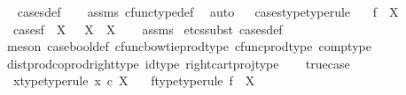 \begin{isabellebody}
%
\isadelimproof
\ \ %
\endisadelimproof
%
\isatagproof
{}\isamarkupfalse%
\ cases{\isacharunderscore}{\kern0pt}def\isanewline
\ \ \isamarkupfalse%
\ assms\ cfunc{\isacharunderscore}{\kern0pt}type{\isacharunderscore}{\kern0pt}def\ \isamarkupfalse%
\ auto%
\endisatagproof
{\isafoldproof}%
%
\isadelimproof
\ \isanewline
%
\endisadelimproof
\isanewline
{}\isamarkupfalse%
\ cases{\isacharunderscore}{\kern0pt}type{\isacharbrackleft}{\kern0pt}type{\isacharunderscore}{\kern0pt}rule{\isacharbrackright}{\kern0pt}{\isacharcolon}{\kern0pt}\isanewline
\ \ \ {\isachardoublequoteopen}f\ {\isacharcolon}{\kern0pt}\ X\ {\isasymrightarrow}\ {\isasymOmega}{\isachardoublequoteclose}\isanewline
\ \ \ {\isachardoublequoteopen}cases{\isacharparenleft}{\kern0pt}f{\isacharparenright}{\kern0pt}\ {\isacharcolon}{\kern0pt}\ X\ \ {\isasymrightarrow}\ X\ {\isasymCoprod}\ X{\isachardoublequoteclose}\isanewline
%
\isadelimproof
\ \ %
\endisadelimproof
%
\isatagproof
{}\isamarkupfalse%
\ assms\ \isamarkupfalse%
{\isacharparenleft}{\kern0pt}etcs{\isacharunderscore}{\kern0pt}subst\ cases{\isacharunderscore}{\kern0pt}def{}{\isacharcomma}{\kern0pt}\isanewline
\ \ meson\ case{\isacharunderscore}{\kern0pt}bool{\isacharunderscore}{\kern0pt}def{}\ cfunc{\isacharunderscore}{\kern0pt}bowtie{\isacharunderscore}{\kern0pt}prod{\isacharunderscore}{\kern0pt}type\ cfunc{\isacharunderscore}{\kern0pt}prod{\isacharunderscore}{\kern0pt}type\ comp{\isacharunderscore}{\kern0pt}type\isanewline
\ \ dist{\isacharunderscore}{\kern0pt}prod{\isacharunderscore}{\kern0pt}coprod{\isacharunderscore}{\kern0pt}right{\isacharunderscore}{\kern0pt}type\ id{\isacharunderscore}{\kern0pt}type\ right{\isacharunderscore}{\kern0pt}cart{\isacharunderscore}{\kern0pt}proj{\isacharunderscore}{\kern0pt}type{\isacharparenright}{\kern0pt}%
\endisatagproof
{\isafoldproof}%
%
\isadelimproof
\isanewline
%
\endisadelimproof
\ \ \isanewline
{}\isamarkupfalse%
\ true{\isacharunderscore}{\kern0pt}case{\isacharcolon}{\kern0pt}\isanewline
\ \ \ x{\isacharunderscore}{\kern0pt}type{\isacharbrackleft}{\kern0pt}type{\isacharunderscore}{\kern0pt}rule{\isacharbrackright}{\kern0pt}{\isacharcolon}{\kern0pt}\ {\isachardoublequoteopen}x\ {\isasymin}\isactrlsub c\ X{\isachardoublequoteclose}\isanewline
\ \ \ f{\isacharunderscore}{\kern0pt}type{\isacharbrackleft}{\kern0pt}type{\isacharunderscore}{\kern0pt}rule{\isacharbrackright}{\kern0pt}{\isacharcolon}{\kern0pt}\ {\isachardoublequoteopen}f\ {\isacharcolon}{\kern0pt}\ X\ {\isasymrightarrow}\ {\isasymOmega}{\isachardoublequoteclose}\isanewline

\end{isabellebody}
